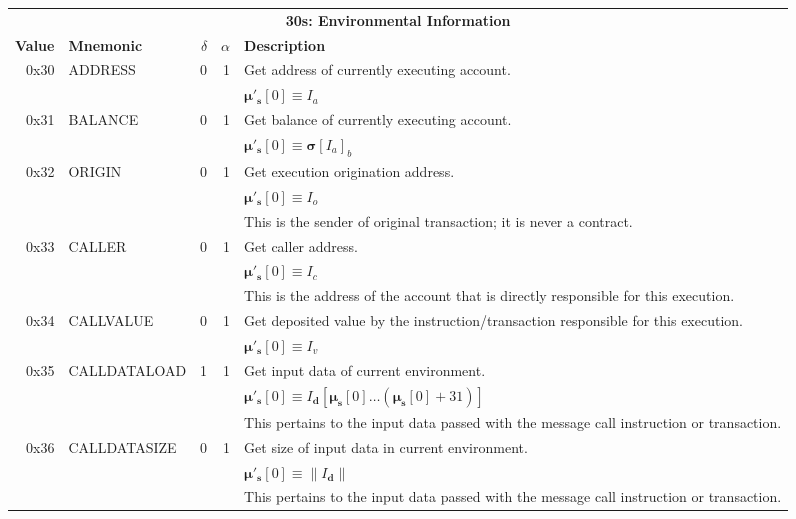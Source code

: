 \documentclass[9pt,oneside]{amsart}
\begin{document}
\begin{tabular*}{\columnwidth}[h]{rlrrl}
\toprule
\multicolumn{5}{c}{\textbf{30s: Environmental Information}} \vspace{5pt} \\
\textbf{Value} & \textbf{Mnemonic} & $\delta$ & $\alpha$ & \textbf{Description} \vspace{5pt} \\
0x30 & {\small ADDRESS} & 0 & 1 & Get address of currently executing account. \\
&&&& $\boldsymbol{\mu}'_\mathbf{s}[0] \equiv I_a$ \\
\midrule
0x31 & {\small BALANCE} & 0 & 1 & Get balance of currently executing account. \\
&&&& $\boldsymbol{\mu}'_\mathbf{s}[0] \equiv \boldsymbol{\sigma}[I_a]_b$ \\
\midrule
0x32 & {\small ORIGIN} & 0 & 1 & Get execution origination address. \\
&&&& $\boldsymbol{\mu}'_\mathbf{s}[0] \equiv I_o$ \\
&&&& This is the sender of original transaction; it is never a contract. \\
\midrule
0x33 & {\small CALLER} & 0 & 1 & Get caller address. \\
&&&& $\boldsymbol{\mu}'_\mathbf{s}[0] \equiv I_c$ \\
&&&& This is the address of the account that is directly responsible for this execution. \\
\midrule
0x34 & {\small CALLVALUE} & 0 & 1 & Get deposited value by the instruction/transaction responsible for this execution. \\
&&&& $\boldsymbol{\mu}'_\mathbf{s}[0] \equiv I_v$ \\
\midrule
0x35 & {\small CALLDATALOAD} & 1 & 1 & Get input data of current environment. \\
&&&& $\boldsymbol{\mu}'_\mathbf{s}[0] \equiv I_\mathbf{d}[ \boldsymbol{\mu}_\mathbf{s}[0] \dots (\boldsymbol{\mu}_\mathbf{s}[0] + 31) ]$ \\
&&&& This pertains to the input data passed with the message call instruction or transaction. \\
\midrule
0x36 & {\small CALLDATASIZE} & 0 & 1 & Get size of input data in current environment. \\
&&&& $\boldsymbol{\mu}'_\mathbf{s}[0] \equiv \lVert I_\mathbf{d} \rVert$ \\
&&&& This pertains to the input data passed with the message call instruction or transaction. \\

\end{tabular*}
\end{document}
